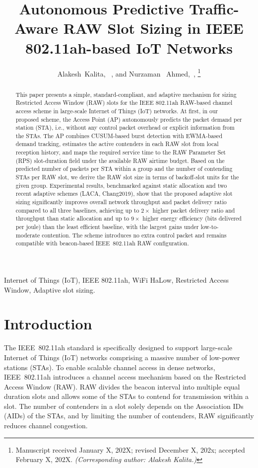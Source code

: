 \documentclass[journal]{IEEEtran}
\title{Autonomous Predictive Traffic-Aware RAW Slot Sizing in IEEE 802.11ah-based IoT Networks}
\author{Alakesh~Kalita, ~\IEEEmembership{Senior Member,~IEEE}, and Nurzaman ~Ahmed,~\IEEEmembership{Member,~IEEE},
		\thanks{ Manuscript received January X, 202X; revised December X, 202x; accepted February X, 202X. %
        \textit{(Corresponding author: Alakesh Kalita.)}}
		\IEEEcompsocitemizethanks{\IEEEcompsocthanksitem A. Kalita is with the Department of  Mathematics and Computing, Indian Institute of Technology (ISM) Dhanbad, India. \protect\\
		E-mail: alakesh.kalita1025@gmail.com\\
			N. \rev{Ahmed} is with Donald Danforth Plant Science Center, USA. \protect\\
		E-mail: nurzaman713@gmail.com

		}
	}
\newcommand{\rev}[1]{{\color{blue}#1}}
\newcommand{\new}[1]{{\color{red}#1}}
\begin{document}
\maketitle

\begin{abstract}
This paper presents a simple, standard-compliant, and adaptive mechanism for sizing Restricted Access Window (RAW) slots for the IEEE 802.11ah RAW-based channel access scheme in large-scale Internet of Things (IoT) networks. At first, in our proposed scheme, the Access Point (AP) autonomously predicts the packet demand per station (STA), i.e., without any control packet overhead or explicit information from the STAs. \rev{The AP combines CUSUM-based burst detection with EWMA-based demand tracking, estimates the active contenders in each RAW slot from local reception history, and maps the required service time to the RAW Parameter Set (RPS) slot-duration field under the available RAW airtime budget.} Based on the predicted number of packets per STA within a group and the number of contending STAs per RAW slot, we derive the RAW slot size in terms of backoff-slot units for the given group. %
Experimental results, benchmarked against static allocation and two recent adaptive schemes (LACA, Chang2019), show that the proposed adaptive slot sizing significantly improves overall network throughput and packet delivery ratio compared to all three baselines\new{, achieving up to $2\times$ higher packet delivery ratio and throughput than static allocation and up to $9\times$ higher energy efficiency (bits delivered per joule) than the least efficient baseline, with the largest gains under low-to-moderate contention}. \rev{The scheme introduces no extra control packet and remains compatible with beacon-based IEEE~802.11ah RAW configuration.}
\end{abstract}

\begin{IEEEkeywords}
Internet of Things (IoT), IEEE 802.11ah, WiFi HaLow, Restricted Access Window, Adaptive slot sizing.
\end{IEEEkeywords}

\section{Introduction}

The IEEE~802.11ah standard \cite{IEEE80211ah2016} is specifically designed to support large-scale Internet of Things (IoT) networks comprising a massive number of low-power stations (STAs). To enable scalable channel access in dense networks, IEEE~802.11ah introduces a channel access mechanism based on the Restricted Access Window (RAW). RAW divides the beacon interval into multiple equal duration slots and allows some of the STAs to contend for transmission within a slot. The number of contenders in a slot solely depends on the Association IDs (AIDs) of the STAs, and by limiting the number of contenders, RAW significantly reduces channel congestion.
\end{document}
